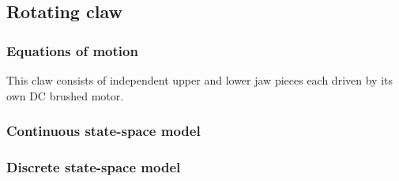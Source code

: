 \subsection{Rotating claw}

\subsubsection{Equations of motion}

This claw consists of independent upper and lower jaw pieces each driven by its
own DC brushed motor.

\subsubsection{Continuous state-space model}

\subsubsection{Discrete state-space model}
